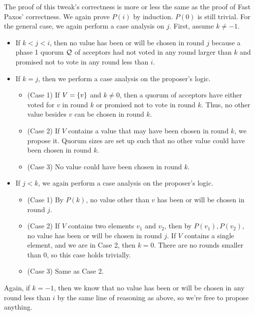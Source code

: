 The proof of this tweak's correctness is more or less the same as the proof of
Fast Paxos' correctness. We again prove $P(i)$ by induction. $P(0)$ is still
trivial. For the general case, we again perform a case analysis on $j$. First,
assume $k \neq -1$.
\begin{itemize}
  \item
    If $k < j < i$, then no value has been or will be chosen in round $j$
    because a phase 1 quorum $\mathcal{Q}$ of acceptors had not voted in any round
    larger than $k$ and promised not to vote in any round less than $i$.

  \item
    If $k = j$, then we perform a case analysis on the proposer's logic.
    \begin{itemize}
      \item
        (Case 1) If $V = \{v\}$ and $k \neq 0$, then a quorum of acceptors
        have either voted for $v$ in round $k$ or promised not to vote in round
        $k$. Thus, no other value besides $v$ can be chosen in round $k$.
      \item
        (Case 2) If $V$ contains a value that may have been chosen in round
        $k$, we propose it. Quorum sizes are set up such that no other value
        could have been chosen in round $k$.
      \item
        (Case 3) No value could have been chosen in round $k$.
    \end{itemize}

  \item
    If $j < k$, we again perform a case analysis on the proposer's logic.
    \begin{itemize}
      \item
        (Case 1) By $P(k)$, no value other than $v$ has been or will be chosen
        in round $j$.
      \item
        (Case 2) If $V$ contains two elements $v_1$ and $v_2$, then by $P(v_1),
        P(v_2)$, no value has been or will be chosen in round $j$. If $V$
        contains a single element, and we are in Case 2, then $k = 0$. There
        are no rounds smaller than $0$, so this case holds trivially.
      \item
        (Case 3) Same as Case 2.
    \end{itemize}
\end{itemize}
Again, if $k = -1$, then we know that no value has been or will be chosen in
any round less than $i$ by the same line of reasoning as above, so we're free
to propose anything.
